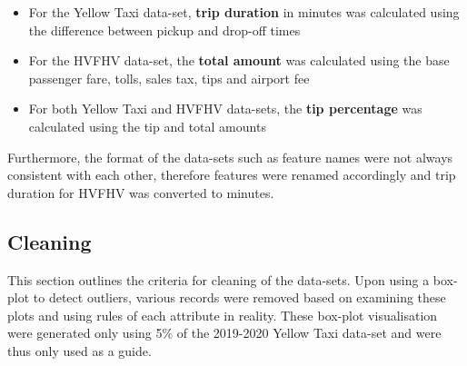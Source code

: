 \documentclass[11pt]{article}
\begin{document}
\begin{itemize}
    \item For the Yellow Taxi data-set, \textbf{trip duration} in minutes was calculated using the difference between pickup and drop-off times
    \item For the HVFHV data-set, the \textbf{total amount} was calculated using the base passenger fare, tolls, sales tax, tips and airport fee
    \item For both Yellow Taxi and HVFHV data-sets, the \textbf{tip percentage} was calculated using the tip and total amounts
\end{itemize}

Furthermore, the format of the data-sets such as feature names were not always consistent with each other, therefore features were renamed accordingly and trip duration for HVFHV was converted to minutes. 

\subsection{Cleaning}
This section outlines the criteria for cleaning of the data-sets. Upon using a box-plot to detect outliers, various records were removed based on examining these plots and using rules of each attribute in  reality. These box-plot visualisation were generated only using 5\% of the 2019-2020 Yellow Taxi data-set and were thus only used as a guide. 
\end{document}
